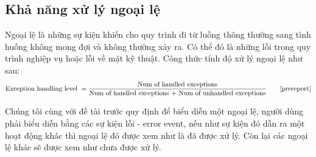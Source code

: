 \subsection{Khả năng xử lý ngoại lệ}
Ngoại lệ là những sự kiện khiến cho quy trình đi từ luồng thông thường sang tình huống không mong đợi và không thường xảy ra. Có thể đó là những lỗi trong quy trình nghiệp vụ hoặc lỗi về mặt kỹ thuật. Công thức tính độ xử lý ngoại lệ như sau:
\[ \text{Exception handling level } = \frac{\text{Num of handled exceptions}}{\text{Num of handled exceptions + Num of unhandled exceptions}} \tag*{\cite{prereport}}\]
\par
Chúng tôi cùng với đề tài trước quy định để biểu
diễn một ngoại lệ, người dùng phải biểu diễn bằng các sự kiện lỗi - error event, nếu như sự kiện đó dẫn ra một hoạt động khác thì ngoại lệ đó được xem như là đã được xử lý. Còn lại các ngoại lệ khác sẽ được xem như chưa được xử lý.